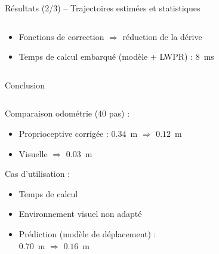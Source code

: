 \begin{frame}{Résultats (2/3) -- Trajectoires estimées et statistiques}
\begin{columns}
\begin{column}{0.5\linewidth}
            \begin{itemize}
                \item Fonctions de correction $\Rightarrow$ réduction de la dérive
                \item Temps de calcul embarqué (modèle + LWPR) : $8$~ms
            \end{itemize}
        \end{column}
    \end{columns}
\end{frame}

\begin{frame}{Conclusion}
    \begin{columns}
        \begin{column}{0.4\linewidth}
            Comparaison odométrie (40 pas) :
            \begin{itemize}
                \item Proprioceptive corrigée : $0.34$~m $\Rightarrow$ $\bm{0.12}$~m
                \item Visuelle  $\Rightarrow$ $\bm{0.03}$~m
            \end{itemize}
            \vspace{1.0em}
            Cas d'utilisation :
            \begin{itemize}
                \item Temps de calcul
                \item Environnement visuel non adapté
                \item Prédiction (modèle de déplacement) :\\
                    $0.70$~m $\Rightarrow$ $\bm{0.16}$~m
            \end{itemize}
        \end{column}
        \begin{column}{0.6\linewidth}
            \centering
            \scriptsize
            \newline
            \vspace{1.0em}

\end{column}
\end{columns}
\end{frame}
